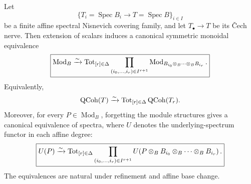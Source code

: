 \begin{lemma}
\label{lem:var-affine-nis-module-descent}
Let
\[
    \{T_i=\operatorname{Spec}B_i\longrightarrow
      T=\operatorname{Spec}B\}_{i\in I}
\]
be a finite affine spectral Nisnevich covering family, and let \(T_\bullet\to T\) be its \v{C}ech nerve.  Then extension of scalars induces a canonical symmetric monoidal equivalence
\[
    \boxed{
    \operatorname{Mod}_B
    \xrightarrow{\sim}
    \operatorname{Tot}_{[r]\in\Delta}
    \prod_{(i_0,\ldots,i_r)\in I^{r+1}}
    \operatorname{Mod}_{
      B_{i_0}\otimes_B\cdots\otimes_BB_{i_r}
    }.
    }
\]
Equivalently,
\[
    \operatorname{QCoh}(T)
    \xrightarrow{\sim}
    \operatorname{Tot}_{[r]\in\Delta}\operatorname{QCoh}(T_r).
\]
Moreover, for every \(P\in\operatorname{Mod}_B\), forgetting the module structures gives a canonical equivalence of spectra, where \(U\) denotes the underlying-spectrum functor in each affine degree:
\[
    \boxed{
    U(P)
    \xrightarrow{\sim}
    \operatorname{Tot}_{[r]\in\Delta}
    \prod_{(i_0,\ldots,i_r)\in I^{r+1}}
    U\!\left(
      P\otimes_B
      B_{i_0}\otimes_B\cdots\otimes_BB_{i_r}
    \right).
    }
\]
The equivalences are natural under refinement and affine base change.
\end{lemma}

